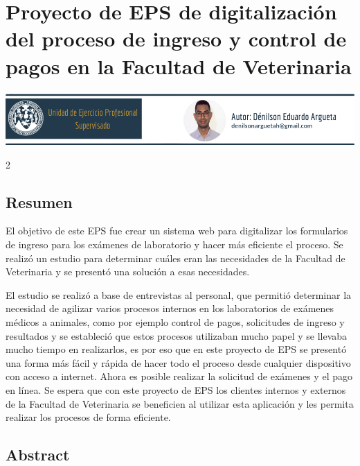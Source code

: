 \documentclass[12pt,spanish,Letterpaper,openany]{book}
\begin{document}
\hypertarget{Denilson}{%
\chapter{Proyecto de EPS de digitalización del proceso de ingreso y control de pagos en la Facultad de Veterinaria}\label{Denilson}}

\begin{center}\includegraphics[width=1\linewidth]{images/denilson_00} \end{center}

\begin {multicols}{2}

\hypertarget{resumen-1}{%
\section{Resumen}\label{resumen-1}}

El objetivo de este EPS fue crear un sistema web para digitalizar los formularios de ingreso para los exámenes de laboratorio y hacer más eficiente el proceso. Se realizó un estudio para determinar cuáles eran las necesidades de la Facultad de Veterinaria y se presentó una solución a esas necesidades.

El estudio se realizó a base de entrevistas al personal, que permitió determinar la necesidad de agilizar varios procesos internos en los laboratorios de exámenes médicos a animales, como por ejemplo control de pagos, solicitudes de ingreso y resultados y se estableció que estos procesos utilizaban mucho papel y se llevaba mucho tiempo en realizarlos, es por eso que en este proyecto de EPS se presentó una forma más fácil y rápida de hacer todo el proceso desde cualquier dispositivo con acceso a internet. Ahora es posible realizar la solicitud de exámenes y el pago en línea.
Se espera que con este proyecto de EPS los clientes internos y externos de la Facultad de Veterinaria se beneficien al utilizar esta aplicación y les permita realizar los procesos de forma eficiente.

\hypertarget{abstract-1}{%
\section{Abstract}\label{abstract-1}}


\end{multicols}
\end{document}
